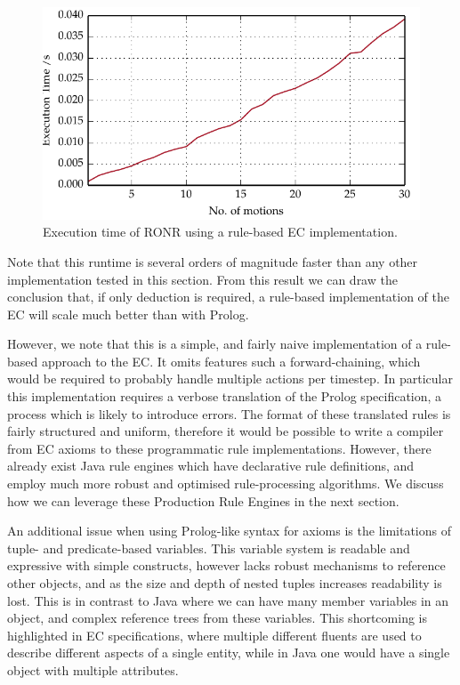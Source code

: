 \begin{figure}
\centering
\includegraphics{gfx/ec/rulebased}
\caption{Execution time of RONR using a rule-based EC implementation.}\label{fig:rulec}
\end{figure}


Note that this runtime is several orders of magnitude faster than any other
implementation tested in this section. From this result we can draw the
conclusion that, if only deduction is required, a rule-based implementation of
the \ac{EC} will scale much better than with Prolog.

However, we note that this is a simple, and fairly naive implementation of a
rule-based approach to the \ac{EC}. It omits features such a forward-chaining,
which would be required to probably handle multiple actions per timestep. In
particular this implementation requires a verbose translation of the Prolog
specification, a process which is likely to introduce errors. The format of
these translated rules is fairly structured and uniform, therefore it would be
possible to write a compiler from \ac{EC} axioms to these programmatic rule
implementations. However, there already exist Java rule engines which have
declarative rule definitions, and employ much more robust and optimised 
rule-processing algorithms. We discuss how we can leverage these Production Rule
Engines in the next section.

An additional issue when using Prolog-like syntax for axioms is the
limitations of tuple- and predicate-based variables. This variable system is
readable and expressive with simple constructs, however lacks robust mechanisms to
reference other objects, and as the size and depth of nested tuples increases
readability is lost. This is in contrast to Java where we can have many member
variables in an object, and complex reference trees from these variables. This
shortcoming is highlighted in \ac{EC} specifications, where multiple different
fluents are used to describe different aspects of a single entity, while in
Java one would have a single object with multiple attributes.

